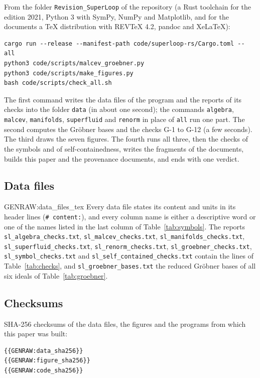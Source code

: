 From the folder \texttt{Revision\_SuperLoop} of the repository (a Rust toolchain for the edition 2021,
Python 3 with SymPy, NumPy and Matplotlib, and for the documents a TeX distribution with REVTeX 4.2,
pandoc and XeLaTeX):
\begin{verbatim}
cargo run --release --manifest-path code/superloop-rs/Cargo.toml -- all
python3 code/scripts/malcev_groebner.py
python3 code/scripts/make_figures.py
bash code/scripts/check_all.sh
\end{verbatim}
The first command writes the data files of the program and the reports of its checks into the folder
\texttt{data} (in about one second); the commands \texttt{algebra}, \texttt{malcev},
\texttt{manifolds}, \texttt{superfluid} and \texttt{renorm} in place of \texttt{all} run one part. The
second computes the Gr\"obner bases and the checks G-1 to G-12 (a few seconds). The third draws the
seven figures. The fourth runs all three, then the checks of the symbols and of self-containedness,
writes the fragments of the documents, builds this paper and the provenance documents, and ends with
one verdict.

\subsection{Data files}

{{GENRAW:data_files_tex}}
Every data file states its content and units in its header lines (\texttt{\# content:}), and every
column name is either a descriptive word or one of the names listed in the last column of
Table~\ref{tab:symbols}. The reports \texttt{sl\_algebra\_checks.txt}, \texttt{sl\_malcev\_checks.txt},
\texttt{sl\_manifolds\_checks.txt}, \texttt{sl\_superfluid\_checks.txt}, \texttt{sl\_renorm\_checks.txt},
\texttt{sl\_groebner\_checks.txt}, \texttt{sl\_symbol\_checks.txt} and
\texttt{sl\_self\_contained\_checks.txt} contain the lines of Table~\ref{tab:checks}, and
\texttt{sl\_groebner\_bases.txt} the reduced Gr\"obner bases of all six ideals of
Table~\ref{tab:groebner}.

\subsection{Checksums}

SHA-256 checksums of the data files, the figures and the programs from which this paper was built:
{\footnotesize
\begin{verbatim}
{{GENRAW:data_sha256}}
{{GENRAW:figure_sha256}}
{{GENRAW:code_sha256}}
\end{verbatim}
}

\clearpage
\twocolumngrid
